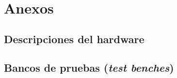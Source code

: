 \section{Anexos}

\subsection{Descripciones del hardware}



\subsection{Bancos de pruebas (\textit{test benches})}

